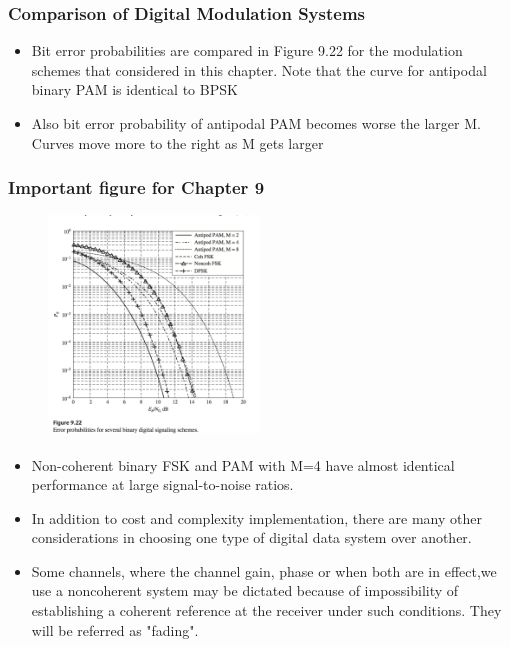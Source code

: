\documentclass{beamer}
\begin{document}
\begin{frame}
	\frametitle{Comparison of Digital Modulation Systems}
	\begin{itemize}
		\item Bit error probabilities are compared in Figure 9.22 for the modulation schemes that considered in this chapter. Note that the curve for antipodal binary PAM is identical to BPSK
		\item  Also bit error probability of antipodal PAM  becomes worse the larger M. Curves move more to the right as M gets larger
	\end{itemize}
\end{frame}

	\begin{frame}
	\frametitle{Important figure for Chapter 9}
	\begin{figure}
\includegraphics[width=0.5\textwidth]{9_5_1.png}
	\end{figure}
\end{frame}

\begin{frame}
	\begin{itemize}
	\item Non-coherent binary FSK and PAM with M=4 have almost identical performance at large signal-to-noise ratios.
	\item	In addition to cost and complexity implementation, there are many other considerations in choosing one type of digital data system over another.
	\item Some channels, where the channel gain, phase or when both are in effect,we use a noncoherent system may be dictated because of impossibility of establishing a coherent reference at the receiver  under such conditions. They will be referred as "fading".
	\end{itemize}
\end{frame}
\end{document}
